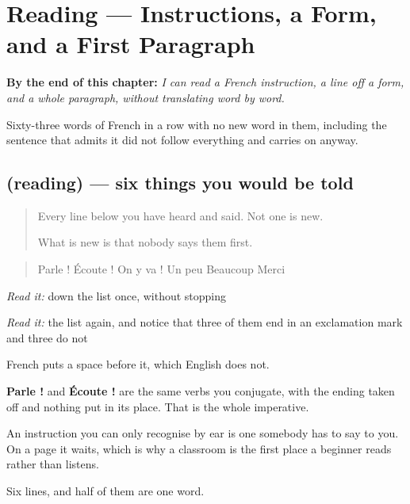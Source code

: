 
\chapter{Reading — Instructions, a Form, and a First Paragraph}
\label{ch:fr-premiere-lecture}

\begin{chapteropening}
\textbf{By the end of this chapter:} \emph{I can read a French instruction, a line off a form, and a whole paragraph, without translating word by word.}

Sixty-three words of French in a row with no new word in them, including the sentence that admits it did not follow everything and carries on anyway.
\end{chapteropening}

\section[(reading)]{(reading) — six things you would be told}

\label{lesson:FR-C45-instructions}



\begin{quote}
Every line below you have heard and said. Not one is new.

What is new is that nobody says them first.
\end{quote}

\begin{tcolorbox}[breakable,skin=enhanced,colback=orange!6,colframe=orange!45!black,boxrule=0.5pt,arc=1mm,left=6pt,right=6pt,top=4pt,bottom=4pt,fonttitle=\bfseries,title={Read this}]
\begin{quote}
Parle ! Écoute ! On y va ! Un peu Beaucoup Merci
\end{quote}

\emph{Read it:} down the list once, without stopping

\emph{Read it:} the list again, and notice that three of them end in an exclamation mark and three do not

French puts a space before it, which English does not.
\end{tcolorbox}

\begin{culture}
\textbf{Parle !} and \textbf{Écoute !} are the same verbs you conjugate, with the ending taken off and nothing put in its place. That is the whole imperative.

An instruction you can only recognise by ear is one somebody has to say to you. On a page it waits, which is why a classroom is the first place a beginner reads rather than listens.

Six lines, and half of them are one word.
\end{culture}

